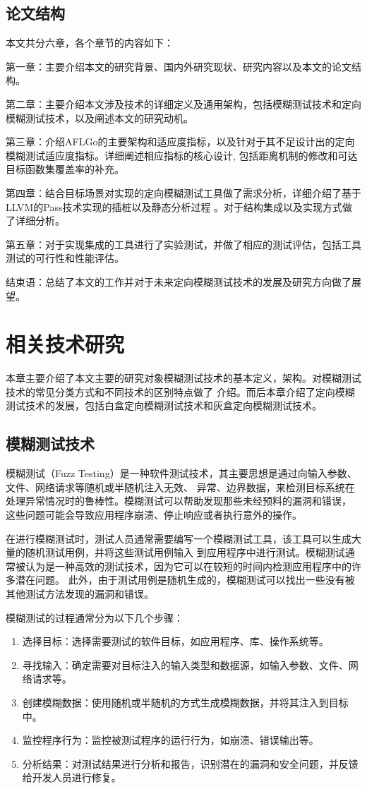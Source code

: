 \documentclass[bachelor]{njupthesis}
\begin{document}
\section{论文结构}
本文共分六章，各个章节的内容如下：

第一章：主要介绍本文的研究背景、国内外研究现状、研究内容以及本文的论文结构。

第二章：主要介绍本文涉及技术的详细定义及通用架构，包括模糊测试技术和定向模糊测试技术，以及阐述本文的研究动机。

第三章：介绍AFLGo的主要架构和适应度指标，以及针对于其不足设计出的定向模糊测试适应度指标。详细阐述相应指标的核心设计,
包括距离机制的修改和可达目标函数集覆盖率的补充。

第四章：结合目标场景对实现的定向模糊测试工具做了需求分析，详细介绍了基于LLVM的Pass技术实现的插桩以及静态分析过程
。对于结构集成以及实现方式做了详细分析。

第五章：对于实现集成的工具进行了实验测试，并做了相应的测试评估，包括工具测试的可行性和性能评估。

结束语：总结了本文的工作并对于未来定向模糊测试技术的发展及研究方向做了展望。

\chapter{相关技术研究}
本章主要介绍了本文主要的研究对象模糊测试技术的基本定义，架构。对模糊测试技术的常见分类方式和不同技术的区别特点做了
介绍。而后本章介绍了定向模糊测试技术的发展，包括白盒定向模糊测试技术和灰盒定向模糊测试技术。
\section{模糊测试技术}
模糊测试（Fuzz Testing）是一种软件测试技术，其主要思想是通过向输入参数、文件、网络请求等随机或半随机注入无效、
异常、边界数据，来检测目标系统在处理异常情况时的鲁棒性。模糊测试可以帮助发现那些未经预料的漏洞和错误，
这些问题可能会导致应用程序崩溃、停止响应或者执行意外的操作。

在进行模糊测试时，测试人员通常需要编写一个模糊测试工具，该工具可以生成大量的随机测试用例，并将这些测试用例输入
到应用程序中进行测试。模糊测试通常被认为是一种高效的测试技术，因为它可以在较短的时间内检测应用程序中的许多潜在问题。
此外，由于测试用例是随机生成的，模糊测试可以找出一些没有被其他测试方法发现的漏洞和错误。

模糊测试的过程通常分为以下几个步骤：

\begin{enumerate}[label=(\arabic*),leftmargin=48pt]
 	\item 选择目标：选择需要测试的软件目标，如应用程序、库、操作系统等。
	\item 寻找输入：确定需要对目标注入的输入类型和数据源，如输入参数、文件、网络请求等。
	\item 创建模糊数据：使用随机或半随机的方式生成模糊数据，并将其注入到目标中。
	\item 监控程序行为：监控被测试程序的运行行为，如崩溃、错误输出等。
	\item 分析结果：对测试结果进行分析和报告，识别潜在的漏洞和安全问题，并反馈给开发人员进行修复。
\end{enumerate}
\end{document}
